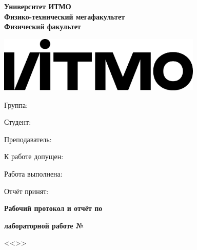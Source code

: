   \noindent
  \begin{minipage}{.5\textwidth}
    \centering
    \textbf{Университет ИТМО} \\
    \textbf{Физико-технический мегафакультет} \\
    \textbf{Физический факультет}
\end{minipage}
\begin{minipage}{.5\textwidth}
  \hspace{20mm}
  \includegraphics[width=0.73\textwidth]{./assets/logo.eps}
\end{minipage}

\vskip 5mm

\noindent\hrulefill

\vskip 5mm

\noindent
\begin{minipage}{.5\textwidth}
  Группа: \phyitmogroup

  Студент: \phyitmostudent

  Преподаватель: \phyitmoteacher 
\end{minipage}
\begin{minipage}{.5\textwidth}
  К работе допущен:

  Работа выполнена: 

  Отчёт принят: 
\end{minipage}

\vskip 7mm

\begin{center}
  \LARGE{\textbf{Рабочий протокол и отчёт по}}
  
  \LARGE{\textbf{лабораторной работе № \phyitmonumber}}

  \Large{<<\phyitmotitle>>}
\end{center}
